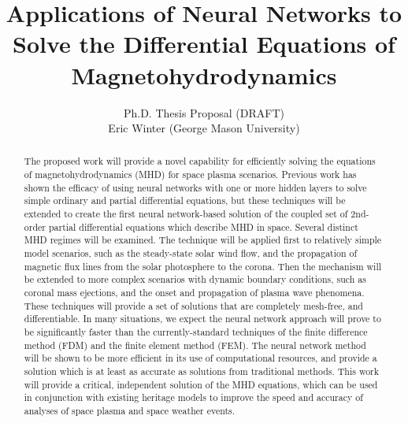\documentclass{article}
\title{Applications of Neural Networks to Solve the Differential Equations of Magnetohydrodynamics}
\author{Ph.D. Thesis Proposal (DRAFT)\\Eric Winter (George Mason University)}
\begin{document}
\begin{titlepage}
\maketitle
\end{titlepage}


\begin{abstract}

The proposed work will provide a novel capability for efficiently solving the equations of magnetohydrodynamics (MHD) for space plasma scenarios. Previous work has shown the efficacy of using neural networks with one or more hidden layers to solve simple ordinary and partial differential equations, but these techniques will be extended to create the first neural network-based solution of the coupled set of 2nd-order partial differential equations which describe MHD in space. Several distinct MHD regimes will be examined. The technique will be applied first to relatively simple model scenarios, such as the steady-state solar wind flow, and the propagation of magnetic flux lines from the solar photosphere to the corona. Then the mechanism will be extended to more complex scenarios with dynamic boundary conditions, such as coronal mass ejections, and the onset and propagation of plasma wave phenomena. These techniques will provide a set of solutions that are completely mesh-free, and differentiable. In many situations, we expect the neural network approach will prove to be significantly faster than the currently-standard techniques of the finite difference method (FDM) and the finite element method (FEM). The neural network method will be shown to be more efficient in its use of computational resources, and provide a solution which is at least as accurate as solutions from traditional methods. This work will provide a critical, independent solution of the MHD equations, which can be used in conjunction with existing heritage models to improve the speed and accuracy of analyses of space plasma and space weather events.

\end{abstract}


\newpage

\tableofcontents

\end{document}
